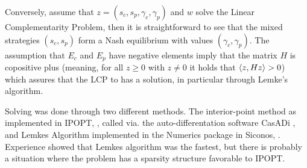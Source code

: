 Conversely, assume that $z=(s_c,s_p,\gamma_c,\gamma_p)$ and $w$ solve the Linear Complementarity Problem, then it is straightforward to see that the mixed strategies $(s_c,s_p)$ form a Nash equilibrium with values $(\gamma_c,\gamma_p)$. The assumption that $E_c$ and $E_p$ have negative elements imply that the matrix $H$ is copositive plus (meaning, for all $z\geq0$ with $z\neq0$ it holds that $\left \langle z,Hz \right \rangle>0$) which assures that the LCP to has a solution, in particular through Lemke's algorithm.

Solving  was done through two different methods. The interior-point method as implemented in IPOPT, \citep{wachter2006implementation}, called via. the auto-differentation software CasADi \citep{Andersson2019}, and Lemkes Algorithm implemented in the Numerics package in Siconos, \citep{acary2019introduction}. Experience showed that Lemkes algorithm was the fastest, but there is probably a situation where the problem has a sparsity structure favorable to IPOPT.



